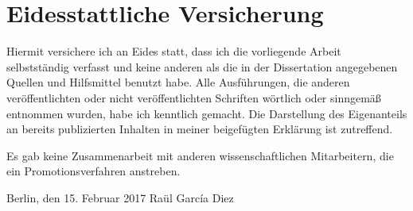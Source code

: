 
\section*{Eidesstattliche Versicherung}
\vspace{3ex}

Hiermit versichere ich an Eides statt, dass ich die vorliegende Arbeit selbstständig verfasst und keine anderen als die in der Dissertation angegebenen Quellen und Hilfsmittel benutzt habe.
Alle Ausführungen, die anderen veröffentlichten oder nicht veröffentlichten Schriften wörtlich oder sinngemäß entnommen wurden, habe ich kenntlich gemacht.
Die Darstellung des Eigenanteils an bereits publizierten Inhalten in meiner beigefügten Erklärung ist zutreffend.

Es gab keine Zusammenarbeit mit anderen wissenschaftlichen Mitarbeitern, die ein Promotionsverfahren anstreben.

\vspace{3cm}

\noindent Berlin, den 15. Februar 2017 \hfill Raül Garc\'{i}a Diez

\cleardoublepage

